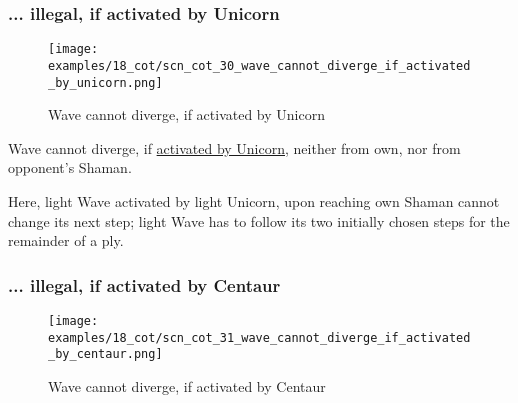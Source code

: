 \clearpage %

\subsubsection*{... illegal, if activated by Unicorn}
\label{sec:Conquest of Tlalocan/Divergence/... illegal, if activated by Unicorn}

\vspace*{-1.4\baselineskip}
\noindent
\begin{figure}[!h]
\texttt{[image: examples/18\_cot/scn\_cot\_30\_wave\_cannot\_diverge\_if\_activated\_by\_unicorn.png]}
\vspace*{-1.3\baselineskip}
\caption{Wave cannot diverge, if activated by Unicorn}
\label{fig:scn_cot_30_wave_cannot_diverge_if_activated_by_unicorn}
\end{figure}

\vspace*{-0.5\baselineskip}
Wave cannot diverge, if
\hyperref[fig:scn_mv_24_wave_activation_by_unicorn_first_step]{activated by Unicorn},
neither from own, nor from opponent's Shaman.

Here, light Wave activated by light Unicorn, upon reaching own Shaman cannot change
its next step; light Wave has to follow its two initially chosen steps for the
remainder of a ply.

\clearpage %

\subsubsection*{... illegal, if activated by Centaur}
\label{sec:Conquest of Tlalocan/Divergence/... illegal, if activated by Centaur}

\vspace*{-1.4\baselineskip}
\noindent
\begin{figure}[!h]
\texttt{[image: examples/18\_cot/scn\_cot\_31\_wave\_cannot\_diverge\_if\_activated\_by\_centaur.png]}
\vspace*{-1.3\baselineskip}
\caption{Wave cannot diverge, if activated by Centaur}
\label{fig:scn_cot_31_wave_cannot_diverge_if_activated_by_centaur}
\end{figure}

